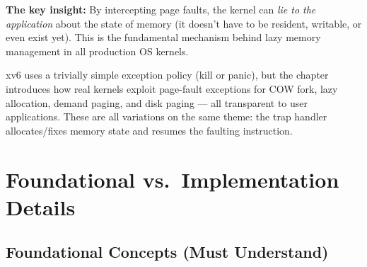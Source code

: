 \documentclass[11pt, a4paper]{article}
\begin{document}
\begin{tcolorbox}[foundational]
\textbf{The key insight:} By intercepting page faults, the kernel can \emph{lie to the application} about the state of memory (it doesn't have to be resident, writable, or even exist yet). This is the fundamental mechanism behind lazy memory management in all production OS kernels.
\end{tcolorbox}

\begin{tcolorbox}[summary, title={Section Summary}]
xv6 uses a trivially simple exception policy (kill or panic), but the chapter introduces how real kernels exploit page-fault exceptions for COW fork, lazy allocation, demand paging, and disk paging --- all transparent to user applications. These are all variations on the same theme: the trap handler allocates/fixes memory state and resumes the faulting instruction.
\end{tcolorbox}

\section{Foundational vs.\ Implementation Details}

\subsection{Foundational Concepts (Must Understand)}
\end{document}
